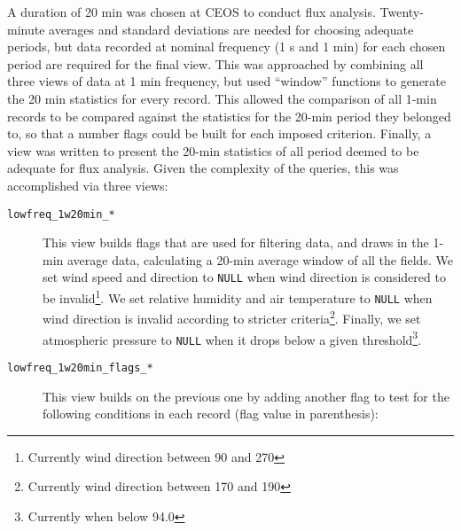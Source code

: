 \documentclass[12pt,letterpaper,titlepage,headings=small,numbers=noenddot]%
{scrartcl}
\begin{document}
A duration of 20 min was chosen at CEOS to conduct flux analysis.
Twenty-minute averages and standard deviations are needed for choosing
adequate periods, but data recorded at nominal frequency (1 s and 1 min)
for each chosen period are required for the final view.  This was
approached by combining all three views of data at 1 min frequency, but
used ``window'' functions to generate the 20 min statistics for every
record.  This allowed the comparison of all 1-min records to be compared
against the statistics for the 20-min period they belonged to, so that a
number flags could be built for each imposed criterion.  Finally, a view
was written to present the 20-min statistics of all period deemed to be
adequate for flux analysis.  Given the complexity of the queries, this was
accomplished via three views:

\begin{description}
\item[\texttt{lowfreq\_1w20min\_*}] This view builds flags that are used
  for filtering data, and draws in the 1-min average data, calculating a
  20-min average window of all the fields.  We set wind speed and direction
  to \texttt{NULL} when wind direction is considered to be
  invalid\footnote{Currently wind direction between 90 and 270}.  We set
  relative humidity and air temperature to \texttt{NULL} when wind
  direction is invalid according to stricter criteria\footnote{Currently
    wind direction between 170 and 190}.  Finally, we set atmospheric
  pressure to \texttt{NULL} when it drops below a given
  threshold\footnote{Currently when below 94.0}.
\item[\texttt{lowfreq\_1w20min\_flags\_*}] This view builds on the previous
  one by adding another flag to test for the following conditions in each
  record (flag value in parenthesis):
\end{description}
\end{document}
